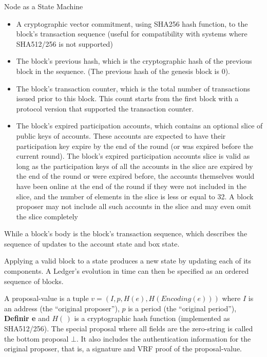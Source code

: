 \documentclass[10pt,a4paper]{article}
\begin{document}
\begin{section}{Node as a State Machine}
\begin{itemize}
    \item
    A cryptographic vector commitment, using SHA256 hash function, to the block's
    transaction sequence (useful for compatibility with systems where SHA512/256 is not supported)
    
    \item
    The block's previous hash, which is the cryptographic hash of the previous
    block in the sequence. (The previous hash of the genesis block is 0).
    
    \item
    The block's transaction counter, which is the total number of transactions
    issued prior to this block. This count starts from the first block with a
    protocol version that supported the transaction counter.
    
    \item
    The block's expired participation accounts, which contains an optional slice
    of public keys of accounts. These accounts are expected to have their
    participation key expire by the end of the round (or was expired before
    the current round).
    The block's expired participation accounts slice is valid as long as the participation keys 
    of all the accounts in the slice are expired by the end of the round or
    were expired before, the accounts themselves would have been online at the end
    of the round if they were not included in the slice, and the number of elements
    in the slice is less or equal to 32. A block proposer may not include all such
    accounts in the slice and may even omit the slice completely
\end{itemize}
While a block's body is the block's transaction sequence, which describes the sequence
of updates to the account state and box state.

Applying a valid block to a state produces a new state by updating each of its components.
A Ledger's evolution in time can then be specified as an ordered sequence of blocks.

A proposal-value is a tuple $v = (I, p, H(e), H(Encoding(e)))$ where 
$I$ is an address (the “original proposer”), 
$p$ is a period (the “original period”), 
{\bf Definir e}
and
$H(\,)$ is a cryptographic hash function (implemented as SHA512/256). 
The special proposal where all fields are the zero-string is called the bottom 
proposal $\bot$. 
It also includes the authentication information for the original proposer, that is, 
a signature and VRF proof of the proposal-value.


\end{section}
\end{document}
